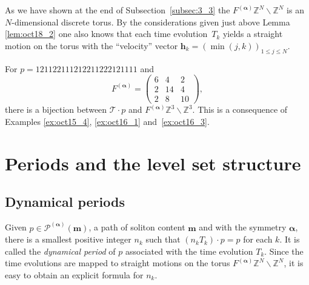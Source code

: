 \documentclass[pdftex]{sigma}
\newcommand{\Z}{{\mathbb Z}}
\newcommand\boa{\boldsymbol{\alpha}}
\newcommand{\m}{{\boldsymbol m}}
\begin{document}
As we have shown at the end of Subsection~\ref{subsec:3_3} the $F^{(\boa)} \Z^N \backslash \Z^N$ is an $N$-dimensional discrete torus.
%
By the considerations given just above Lemma \ref{lem:oct18_2} one also knows that
each time evolution~$T_k$ yields a straight motion on the torus with the ``velocity'' vector
$\boldsymbol{h}_k = (\min(j,k))_{1 \leq j \leq N}$.


\begin{example}\label{ex:oct16_4}
For $p=121122111212211222121111$ and
\begin{equation*}
F^{(\boa)} =
\begin{pmatrix}
6 & 4 & 2 \\
2 & 14 & 4 \\
2 & 8 & 10
\end{pmatrix}
,
\end{equation*}
there is a bijection between ${\mathcal T} \cdot p$ and $F^{(\boa)} \Z^3 \backslash \Z^3$.
This is a consequence of Examples \ref{ex:oct15_4}, \ref{ex:oct16_1} and~\ref{ex:oct16_3}.
\end{example}

\section{Periods and the level set structure}\label{sec:5}
\subsection{Dynamical periods}\label{subsec:5_1}

Given $p \in {\mathcal P}^{(\boa)}(\m)$, a path of soliton content $\m$ and with the symmetry $\boa$,
there is a smallest positive integer $n_k$ such that $(n_k T_k) \cdot p = p$ for each $k$.
It is called the \textit{dynamical period} of $p$ associated with the time evolution $T_k$.
Since the time evolutions are mapped to straight motions on the torus $F^{(\boa)} \Z^N \backslash \Z^N$,
it is easy to obtain an explicit formula for $n_k$.
\end{document}
